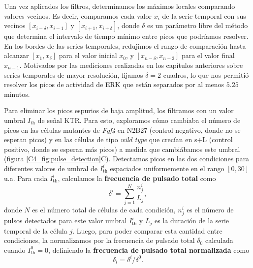 \documentclass[./main.tex]{subfiles}
\begin{document}
Una vez aplicados los filtros, determinamos los máximos locales comparando valores vecinos. Es decir, comparamos cada valor $x_i$ de la serie temporal con sus vecinos $[x_{i-\delta}, x_{i-1}]$ y $[x_{i+1}, x_{i+\delta}]$, donde $\delta$ es un parámetro libre del método que determina el intervalo de tiempo mínimo entre picos que podríamos resolver. En los bordes de las series temporales, redujimos el rango de comparación hasta alcanzar $[x_1, x_\delta]$ para el valor inicial $x_0$, y $[x_{n-\delta}, x_{n-2}]$ para el valor final $x_{n-1}$. Motivados por las mediciones realizadas en los capítulos anteriores sobre series temporales de mayor resolución, fijamos $\delta = 2$ cuadros, lo que nos permitió resolver los picos de actividad de ERK que están separados por al menos $5.25$ minutos.


Para eliminar los picos espurios de baja amplitud, los filtramos con un valor umbral $I_{\text{th}}$ de señal KTR. Para esto, exploramos cómo cambiaba el número de picos en las células mutantes de \textit{Fgf4} en N2B27 (control negativo, donde no se esperan picos) y en las células de tipo \textit{wild type} que crecían en s+L (control positivo, donde se esperan más picos) a medida que cambiábamos este umbral (figura \ref{C4_fig:pulse_detection}C). Detectamos picos en las dos condiciones para diferentes valores de umbral de $I_{\text{th}}^i$ espaciados uniformemente en el rango $[0, 30] $u.a. Para cada $I_{\text{th}}^i$, calculamos la \textbf{frecuencia de pulsado total} como
\begin{equation}
    \delta^i = \sum_{j=1}^N \frac{n_j^i}{L_j},
\end{equation}
donde $N$ es el número total de células de cada condición, $n_j^i$ es el número de pulsos detectados para este valor umbral $I_{\text{th}}^i$ y $L_j$ es la duración de la serie temporal de la célula $j$. Luego, para poder comparar esta cantidad entre condiciones, la normalizamos por la frecuencia de pulsado total $\delta_0$ calculada cuando $I_{\text{th}}^0=0$, definiendo la \textbf{frecuencia de pulsado total normalizada} como 
\begin{equation}
     \overline{\delta_i} =  \delta^i / \delta^0.
\end{equation}
\end{document}
